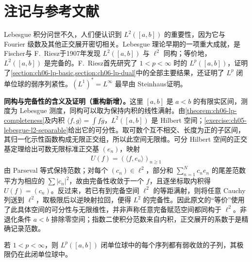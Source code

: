 \documentclass[../../main.tex]{subfiles}
\begin{document}
\section{注记与参考文献}\label{section:ch06-notes-references}\label{section:ch06-linfty-dual}

Lebesgue 积分问世不久，人们便认识到 $L^2([a,b])$ 的重要性，因为它与 Fourier 级数及其他正交展开密切相关。Lebesgue 理论早期的一项重大成就，是 Fischer\cite{folland-bib-44}与 F.~Riesz\cite{folland-bib-114}于1907年发现 $L^2([a,b])$ 与 $\ell^2$ 同构；等价地，$L^2([a,b])$ 是完备的。F.~Riesz\cite{folland-bib-117}首先研究了 $1<p<\infty$ 时的 $L^p([a,b])$，证明了\cref{section:ch06-lp-basic,section:ch06-lp-dual}中的全部主要结果，还证明了 $L^p$ 闭单位球的弱序列紧性。$(L^1)^*=L^\infty$ 最早由 Steinhaus\cite{folland-bib-143}证明。
\begin{remark}
\textbf{同构与完备性的含义及证明（重构新增）。}这里 $[a,b]$ 是 $a<b$ 的有限实区间，测度为 Lebesgue 测度，同构可以取为保持内积的线性满射。由\cref{theorem:ch06-lp-completeness}及内积 $\langle f,g\rangle=\int f\overline g$，$L^2([a,b])$ 是 Hilbert 空间；\cref{exercise:ch05-lebesgue-l2-separable}给出它的可分性。取可数个互不相交、长度为正的子区间，其归一化示性函数构成无限正交组，所以此空间无限维。可分 Hilbert 空间的正交基定理给出可数无限标准正交基 $(e_n)$，映射
\begin{align*}
U(f)=(\langle f,e_n\rangle)_{n\geqslant1}
\end{align*}
由 Parseval 等式保持范数；对每个 $(c_n)\in\ell^2$，部分和 $\sum_{n=1}^N c_ne_n$ 的尾差范数平方为相应的 $\sum|c_n|^2$，故由完备性收敛于一个 $f$，且逐坐标取内积得 $U(f)=(c_n)$。反过来，若已有到完备空间 $\ell^2$ 的等距满射，则将任意 Cauchy 列送到 $\ell^2$，取极限后以逆映射拉回，便得 $L^2$ 的完备性。因此原文的“等价”使用了此具体空间的可分性与无限维性，并非声称任意完备赋范空间都同构于 $\ell^2$。非退化条件 $a<b$ 排除零空间；指数二使积分范数来自内积，正交展开的系数于是精确记录范数。
\end{remark}
\begin{proposition}\label{proposition:ch06-unit-ball-weak-sequences}
若 $1<p<\infty$，则 $L^p([a,b])$ 闭单位球中的每个序列都有弱收敛的子列，其极限仍在此闭单位球中。
\end{proposition}
\end{document}
